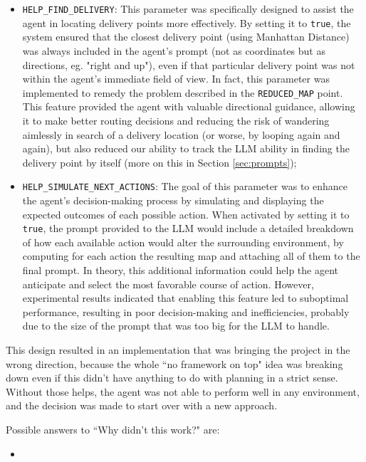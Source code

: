 \begin{itemize}
  \item \texttt{HELP\_FIND\_DELIVERY}: This parameter was specifically designed to
    assist the agent in locating delivery points more effectively. By setting it
    to \texttt{true}, the system ensured that the closest delivery point (using Manhattan
    Distance) was always included in the agent's prompt (not as coordinates but as
    directions, eg. "right and up"), even if that particular delivery point was not
    within the agent's immediate field of view. In fact, this parameter was implemented
    to remedy the problem described in the \texttt{REDUCED\_MAP} point. This feature
    provided the agent with valuable directional guidance, allowing it to make
    better routing decisions and reducing the risk of wandering aimlessly in
    search of a delivery location (or worse, by looping again and again), but
    also reduced our ability to track the LLM ability in finding the delivery
    point by itself (more on this in Section \ref{sec:prompts});

  \item \texttt{HELP\_SIMULATE\_NEXT\_ACTIONS}: The goal of this parameter was to
    enhance the agent's decision-making process by simulating and displaying the
    expected outcomes of each possible action. When activated by setting it to
    \texttt{true}, the prompt provided to the LLM would include a detailed
    breakdown of how each available action would alter the surrounding
    environment, by computing for each action the resulting map and attaching all
    of them to the final prompt. In theory, this additional information could help
    the agent anticipate and select the most favorable course of action. However,
    experimental results indicated that enabling this feature led to suboptimal performance,
    resulting in poor decision-making and inefficiencies, probably due to the size
    of the prompt that was too big for the LLM to handle.
\end{itemize}

This design resulted in an implementation that was bringing the project in the wrong
direction, because the whole ``no framework on top" idea was breaking down even if
this didn't have anything to do with planning in a strict sense. Without those
helps, the agent was not able to perform well in any environment, and the
decision was made to start over with a new approach.

Possible answers to ``Why didn't this work?" are:
\begin{itemize}
  \item
\end{itemize}

